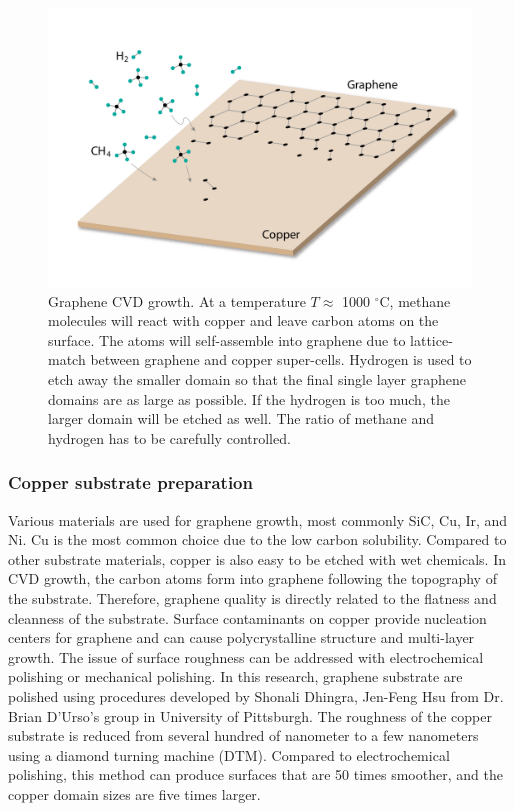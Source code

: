 \documentclass[pdflatex, sectionletters, 12pt, final, phd]{pittetd}    %
\begin{document}
\begin{figure}[h!]
	\centering
	\includegraphics[width=.80\textwidth]{Drawing/CVD.pdf}
	\caption[Graphene CVD growth]{Graphene CVD growth. At a temperature $T \approx$ 1000 $^{\circ}$C, methane molecules will react with copper and leave carbon atoms on the surface. The atoms will self-assemble into graphene due to lattice-match between graphene and copper super-cells. Hydrogen is used to etch away the smaller domain so that the final single layer graphene domains are as large as possible. If the hydrogen is too much, the larger domain will be etched as well. The ratio of methane and hydrogen has to be carefully controlled.}
	\label{FIG:CVD}
\end{figure}

\subsubsection{Copper substrate preparation}

Various materials are used for graphene growth, most commonly SiC, Cu, Ir, and Ni. Cu is the most common choice due to the low carbon solubility\cite{Bae2010}. Compared to other substrate materials, copper is also easy to be etched with wet chemicals. In CVD growth, the carbon atoms form into graphene following the topography of the substrate. Therefore, graphene quality is directly related to the flatness and cleanness of the substrate. Surface contaminants on copper provide nucleation centers for graphene and can cause polycrystalline structure and multi-layer growth\cite{eres2014cooperative}. The issue of surface roughness can be addressed with electrochemical polishing\cite{Bae2010} or mechanical polishing. In this research, graphene substrate are polished using procedures developed by Shonali Dhingra, Jen-Feng Hsu from Dr. Brian D'Urso's group in University of Pittsburgh. The roughness of the copper substrate is reduced from several hundred of nanometer to a few nanometers\cite{dhingra2015quadratic} using a diamond turning machine (DTM). Compared to electrochemical polishing, this method can produce surfaces that are 50 times smoother, and the copper domain sizes are five times larger\cite{dhingra2014chemical}. 
\end{document}
